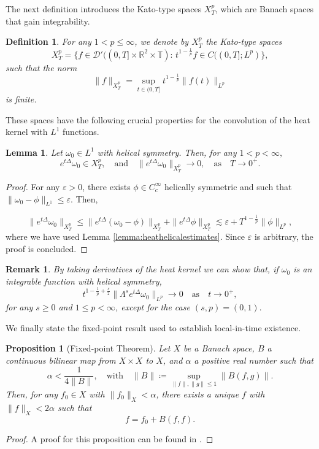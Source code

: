 \documentclass[11pt,a4paper]{article}
\newcommand{\w}{\omega}
\newcommand{\eps}{\varepsilon}
\newcommand{\R}{\mathbb{R}}
\newcommand{\T}{\mathbb{T}}
\newcommand{\D}{\mathcal{D}}
\newcommand{\norm}[1]{\|#1\|}
\def\heat#1{e^{#1 \Delta}}
\newtheorem{prop}[thm]{Proposition}
\newtheorem{lemma}[thm]{Lemma}
\newtheorem{defi}[thm]{Definition}
\newtheorem{rem}[thm]{Remark}
\begin{document}
The next definition introduces the Kato-type spaces $X_T^p$, which are Banach spaces that gain integrability.

\begin{defi}\label{KatoSpace}
For any $1< p\leq \infty$, we denote by $X^p_T$ the Kato-type spaces 
$$X^{p}_T=\{f\in \D'((0,T]\times \R^2\times\T):\,t^{1-\frac1p}f\in C((0,T];L^p)\},$$
such that the norm
$$\|f\|_{X^p_T}=\sup_{t\in(0,T]}t^{1-\frac1p}\|f(t)\|_{L^p}$$
is finite.
\end{defi}

These spaces have the following crucial properties for the convolution of the heat kernel with $L^1$ functions.

\begin{lemma}\label{lem:heatsmallXp}
Let $\w_0\in L^1$ with helical symmetry. Then, for any $1< p< \infty,$
$$\heat{t}\w_0\in X^p_T,\quad\mbox{and}\quad\|\heat{t}\w_0\|_{X^p_T}\to 0,\quad\mbox{as}\quad T\to 0^+.$$
\end{lemma}
\begin{proof}
For any $\eps>0$, there exists $\phi\in C^\infty_c$ helically symmetric and such that $\norm{\w_0-\phi}_{L^1}\leq \eps.$ Then,

$$\|\heat{t}\w_0\|_{X^p_T}\leq \|\heat{t}(\w_0-\phi)\|_{X^p_T}+\|\heat{t}\phi\|_{X^p_T}\lesssim \eps + T^{1-\frac{1}{p}}\|\phi\|_{L^p}, $$
where we have used Lemma \ref{lemma:heathelicalestimates}. Since $\eps$ is arbitrary, the proof is concluded.
\end{proof}

\begin{rem}\label{rem:heatsmallXphigherorder} By taking derivatives of the heat kernel we can show that, if $\w_0$ is an integrable function with helical symmetry,
\begin{equation}\label{eq:heatscaling}
t^{1-\frac{1}{p}+\frac{s}{2}}\|\Lambda^s\heat{t}\w_0\|_{L^p}\to 0 \quad \text{as}\quad t\to 0^+,   
\end{equation}
for any $s\geq 0$ and $1\leq p<\infty$, except for the case $(s,p)=(0,1).$
\end{rem}

We finally state the fixed-point result used to establish local-in-time existence.

\begin{prop}[Fixed-point Theorem]\label{prop:fixedpoint}
Let $X$ be a Banach space, $B$ a continuous bilinear map from $X\times X$ to $X$, and $\alpha$ a positive real number such that 
$$\alpha<\frac{1}{4\|B\|},\quad \text{with} \quad \|B\|\coloneqq \sup_{\|f\|,\|g\|\leq 1}\|B(f,g)\|.$$
Then, for any $f_0\in X$ with $\|f_0\|_X<\alpha$, there exists a unique $f$ with $\|f\|_X<2\alpha$ such that
$$f=f_0+B(f,f).$$
\end{prop}
\begin{proof}
A proof for this proposition can be found in \cite[Lemma 5.5]{cheminfourier}. 
\end{proof}
\end{document}
